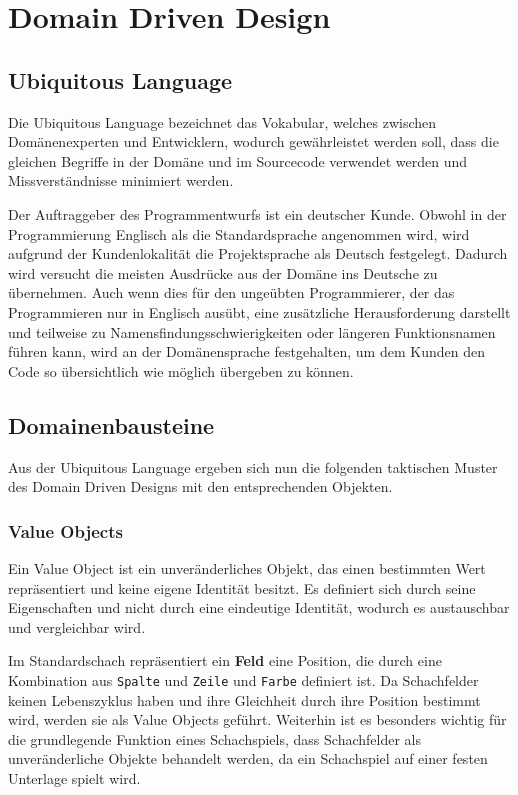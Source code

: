 \chapter{Domain Driven Design}

\section{Ubiquitous Language}

Die Ubiquitous Language bezeichnet das Vokabular, welches zwischen Domänenexperten
und Entwicklern, wodurch gewährleistet werden soll, dass die gleichen Begriffe in der
Domäne und im Sourcecode verwendet werden und Missverständnisse minimiert werden.

Der Auftraggeber des Programmentwurfs ist ein deutscher Kunde. 
Obwohl in der Programmierung Englisch als die Standardsprache angenommen wird, wird aufgrund der Kundenlokalität die Projektsprache als \glqq Deutsch\grqq{} festgelegt. 
Dadurch wird versucht die meisten Ausdrücke aus der Domäne ins Deutsche zu übernehmen. 
Auch wenn dies für den ungeübten Programmierer, der das Programmieren nur in Englisch ausübt, eine zusätzliche Herausforderung darstellt und teilweise zu Namensfindungsschwierigkeiten oder längeren Funktionsnamen führen kann, wird an der Domänensprache festgehalten, um dem Kunden den Code so übersichtlich wie möglich übergeben zu können.

\section{Domainenbausteine}

Aus der Ubiquitous Language ergeben sich nun die folgenden taktischen Muster des Domain
Driven Designs mit den entsprechenden Objekten.

\subsection*{Value Objects}

Ein Value Object ist ein unveränderliches Objekt, das einen bestimmten Wert repräsentiert und keine eigene Identität besitzt. 
Es definiert sich durch seine Eigenschaften und nicht durch eine eindeutige Identität, wodurch es austauschbar und vergleichbar wird.

Im Standardschach repräsentiert ein \textbf{Feld} eine Position, die durch eine Kombination aus \texttt{Spalte} und \texttt{Zeile} und \texttt{Farbe} definiert ist. 
Da Schachfelder keinen Lebenszyklus haben und ihre Gleichheit durch ihre Position bestimmt wird, werden sie als Value Objects geführt. 
Weiterhin ist es besonders wichtig für die grundlegende Funktion eines Schachspiels, dass Schachfelder als unveränderliche Objekte behandelt werden, da ein Schachspiel auf einer \glqq festen Unterlage\grqq{} spielt wird. 

